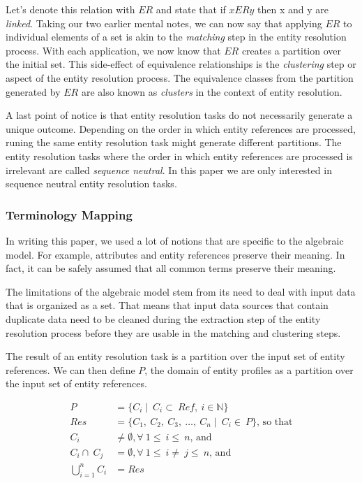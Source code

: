 Let's denote this relation with $ER$ and state that if $xERy$ then x and y
are \textit{linked}\cite{Tal11}.
Taking our two earlier mental notes, we can now say that applying $ER$ to
individual elements of a set is akin to the \textit{matching} step in the
entity resolution process.
With each application, we now know that $ER$ creates a partition over the
initial set.
This side-effect of equivalence relationships is the \textit{clustering}
step or aspect of the entity resolution process.
The equivalence classes from the partition generated by $ER$ are also known
as \textit{clusters} in the context of entity resolution.

A last point of notice is that entity resolution tasks do not necessarily
generate a unique outcome\cite{Tal11}.
Depending on the order in which entity references are processed, runing the
same entity resolution task might generate different partitions.
The entity resolution tasks where the order in which entity references are
processed is irrelevant are called \textit{sequence neutral}\cite{Tal11}.
In this paper we are only interested in sequence neutral entity resolution
tasks.

\subsubsection{Terminology Mapping}\label{subsubsec:Algebraic Terminology Mapping}

In writing this paper, we used a lot of notions that are specific to the
algebraic model.
For example, attributes and entity references preserve their meaning.
In fact, it can be safely assumed that all common terms preserve their
meaning.

The limitations of the algebraic model stem from its need to deal with input
data that is organized as a set.
That means that input data sources that contain duplicate data need to be
cleaned during the extraction step of the entity resolution process before they
are usable in the matching and clustering steps.

The result of an entity resolution task is a partition over the input set of
entity references.
We can then define $P$, the domain of entity profiles as a partition over the
input set of entity references.

\begin{align}
    P &= \{C_i\mid~C_i\subset~Ref,~i\in\mathbb{N}\}\nonumber\\
    Res &= \{C_1,~C_2,~C_3,~\ldots,~C_n\mid~C_i\in~P\}\textrm{, so that}\nonumber\\
    C_i&\neq\emptyset,\forall~1\leq~i\leq~n\textrm{,~and}\nonumber\\
    C_i\cap~C_j&=\emptyset,\forall~1\leq~i\neq~j\leq~n\textrm{,~and}\nonumber\\
    \bigcup_{i=1}^{n}C_i&=Res\nonumber
\end{align}


